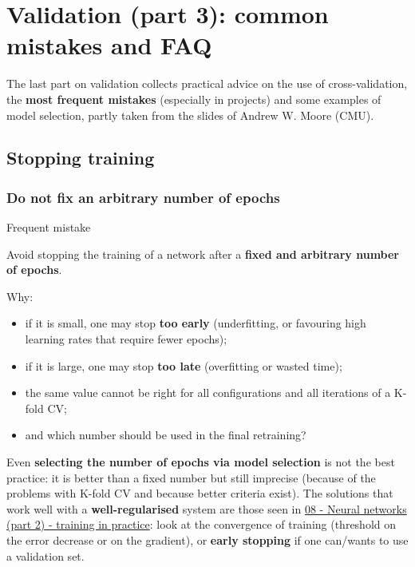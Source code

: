 \chapter{Validation (part 3): common mistakes and FAQ}\label{ch-11}

The last part on validation collects practical advice on the use of
cross-validation, the \textbf{most frequent mistakes} (especially in
projects) and some examples of model selection, partly taken from the
slides of Andrew W. Moore (CMU).

\section{Stopping training}\label{arresto-delladdestramento}

\subsection{Do not fix an arbitrary number of
epochs}\label{non-fissare-un-numero-arbitrario-di-epoche}

\begin{boxwarning}{Frequent mistake}

Avoid stopping the training of a network after a \textbf{fixed and
arbitrary number of epochs}.

\end{boxwarning}

Why:

\begin{itemize}
\tightlist
\item
  if it is small, one may stop \textbf{too early} (underfitting, or
  favouring high learning rates that require fewer epochs);
\item
  if it is large, one may stop \textbf{too late} (overfitting or wasted
  time);
\item
  the same value cannot be right for all configurations and all
  iterations of a K-fold CV;
\item
  and which number should be used in the final retraining?
\end{itemize}

Even \textbf{selecting the number of epochs via model selection} is not
the best practice: it is better than a fixed number but still imprecise
(because of the problems with K-fold CV and because better criteria
exist). The solutions that work well with a \textbf{well-regularised}
system are those seen in
\href{08\%20-\%20Reti\%20neurali\%20(parte\%202)\%20-\%20addestramento\%20in\%20pratica}{08
- Neural networks (part 2) - training in practice}: look at the
convergence of training (threshold on the error decrease or on the
gradient), or \textbf{early stopping} if one can/wants to use a
validation set.

